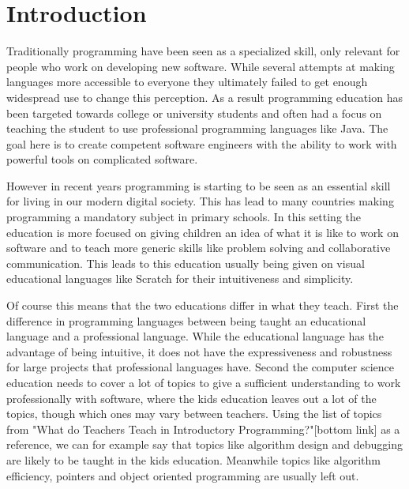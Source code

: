 \chapter{Introduction}
\label{chap:introduction}
Traditionally programming have been seen as a specialized skill, only relevant for people who work on developing new software.
While several attempts at making languages more accessible to everyone  they ultimately failed to get enough widespread use to change this perception.
As a result programming education has been targeted towards college or university students and often had a focus on teaching the student to use professional programming languages like Java.
The goal here is to create competent software engineers with the ability to work with powerful tools on complicated software.

However in recent years programming is starting to be seen as an essential skill for living in our modern digital society.
This has lead to many countries making programming a mandatory subject in primary schools.
In this setting the education is more focused on giving children an idea of what it is like to work on software and to teach more generic skills like problem solving and collaborative communication. This leads to this education usually being given on visual educational languages like Scratch for their intuitiveness and simplicity.

Of course this means that the two educations differ in what they teach.
First the difference in programming languages between being taught an educational language and a professional language. While the educational language has the advantage of being intuitive, it does not have the expressiveness and robustness for large projects that professional languages have.
Second the computer science education needs to cover a lot of topics to give a sufficient understanding to work professionally with software, where the kids education leaves out a lot of the topics, though which ones may vary between teachers.
Using the list of topics from "What do Teachers Teach in Introductory Programming?"[bottom link] as a reference, we can for example say that topics like algorithm design and debugging are likely to be taught in the kids education. Meanwhile topics like algorithm efficiency, pointers and object oriented programming are usually left out.

